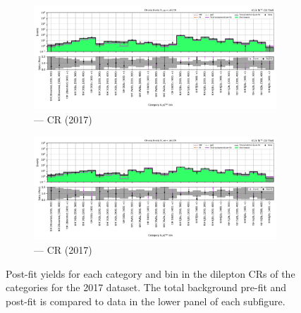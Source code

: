 \begin{figure}[htbp]
    \centering
    \begin{subfigure}[b]{\textwidth}
        \includegraphics[width=\textwidth]{chapters/higgstoinv/figures/mountain_ranges/2017/ttH/Zmumu_tree_fit_b-abs_values_ttH_cats.pdf}
        \caption{\ttH --- \doubleMuCr \gls{CR} (2017)}
    \end{subfigure}
    \hfill
    \begin{subfigure}[b]{\textwidth}
        \includegraphics[width=\textwidth]{chapters/higgstoinv/figures/mountain_ranges/2017/ttH/Zee_tree_fit_b-abs_values_ttH_cats.pdf}
        \caption{\ttH --- \doubleEleCr \gls{CR} (2017)}
    \end{subfigure}
    \caption[Post-fit yields for each category and \ptmiss bin in the dilepton control regions of the \ttH categories for the 2017 dataset]{Post-fit yields for each category and \ptmiss bin in the dilepton \glspl{CR} of the \ttH categories for the 2017 dataset. The total background pre-fit and post-fit is compared to data in the lower panel of each subfigure.}
    \label{fig:htoinv_mountain_range_2017_dilep_CRs_ttH}
\end{figure}

